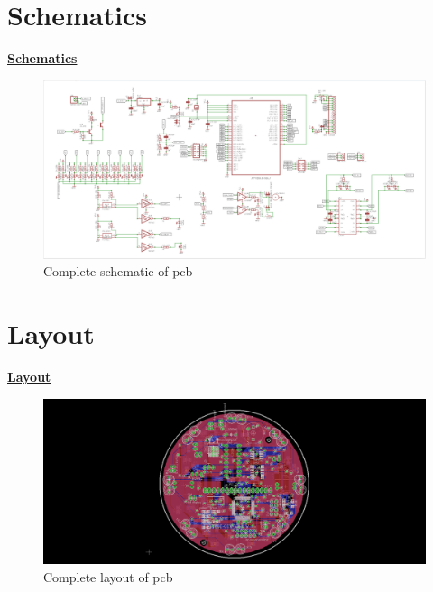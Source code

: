 \documentclass[a4paper,12pt,oneside]{book}
\begin{document}
	\chapter[Schematics]{Schematics}
	\underline{\textbf{\Large{Schematics}}}
	\begin{figure}[h!]
		\includegraphics[width=\textwidth]{./HardwareManual/capture.png}
		\caption{Complete schematic of pcb}
	\end{figure}	
	
	\chapter[Layout]{Layout}
	\underline{\textbf{\Large{Layout}}}

	\begin{figure}[h!]
		\includegraphics[width=\textwidth]{./HardwareManual/capture1.png}
		\caption{Complete layout of pcb}
	\end{figure}		
\end{document}
